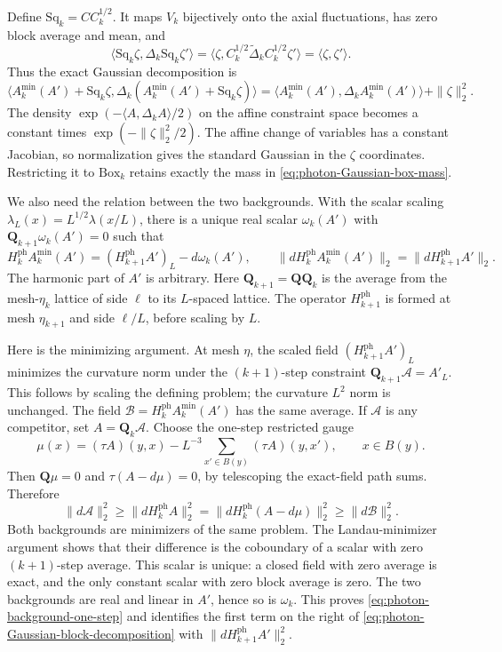 Define $\mathrm{Sq}_k=CC_k^{1/2}$. It maps $V_k$ bijectively onto
the axial fluctuations, has zero block average and mean, and
\[
 \langle\mathrm{Sq}_k\zeta,\Delta_k\mathrm{Sq}_k\zeta'\rangle
  =\langle\zeta,C_k^{1/2}\widetilde\Delta_kC_k^{1/2}\zeta'\rangle
  =\langle\zeta,\zeta'\rangle.
\]
Thus the exact Gaussian decomposition is
\begin{equation}\label{eq:photon-Gaussian-block-decomposition}
 \langle A_k^{\min}(A')+\mathrm{Sq}_k\zeta,
           \Delta_k(A_k^{\min}(A')+\mathrm{Sq}_k\zeta)\rangle
       =\langle A_k^{\min}(A'),\Delta_kA_k^{\min}(A')\rangle
                                                   +\|\zeta\|_2^2.
\end{equation}
The density $\exp(-\langle A,\Delta_kA\rangle/2)$ on the affine
constraint space becomes a constant times $\exp(-\|\zeta\|_2^2/2)$.
The affine change of variables has a constant Jacobian, so
normalization gives the standard Gaussian in the $\zeta$ coordinates.
Restricting it to $\mathrm{Box}_k$ retains exactly the mass in
\eqref{eq:photon-Gaussian-box-mass}.

We also need the relation between the two backgrounds. With the
scalar scaling $\lambda_L(x)=L^{1/2}\lambda(x/L)$, there is a
unique real scalar $\omega_k(A')$ with
$\mathbf Q_{k+1}\omega_k(A')=0$ such that
\begin{equation}\label{eq:photon-background-one-step}
 H_k^{\mathrm{ph}}A_k^{\min}(A')
       =(H_{k+1}^{\mathrm{ph}}A')_L-d\omega_k(A'),
 \qquad
 \|dH_k^{\mathrm{ph}}A_k^{\min}(A')\|_2
       =\|dH_{k+1}^{\mathrm{ph}}A'\|_2.
\end{equation}
The harmonic part of $A'$ is arbitrary.
Here $\mathbf Q_{k+1}=\mathbf Q\mathbf Q_k$ is the average from
the mesh-$\eta_k$ lattice of side $\ell$ to its $L$-spaced
lattice. The operator $H_{k+1}^{\mathrm{ph}}$ is formed at mesh
$\eta_{k+1}$ and side $\ell/L$, before scaling by $L$.

Here is the minimizing argument. At mesh $\eta$, the scaled field
$(H_{k+1}^{\mathrm{ph}}A')_L$ minimizes the curvature norm under
the $(k+1)$-step constraint $\mathbf Q_{k+1}\mathscr A=A'_L$.
This follows by scaling the defining problem; the curvature
$L^2$ norm is unchanged. The field
$\mathscr B=H_k^{\mathrm{ph}}A_k^{\min}(A')$ has the same average.
If $\mathscr A$ is any competitor, set $A=\mathbf Q_k\mathscr A$.
Choose the one-step restricted gauge
\[
 \mu(x)=(\tau A)(y,x)
            -L^{-3}\sum_{x'\in B(y)}(\tau A)(y,x'),
                 \qquad x\in B(y).
\]
Then $\mathbf Q\mu=0$ and $\tau(A-d\mu)=0$, by telescoping
the exact-field path sums. Therefore
\[
 \|d\mathscr A\|_2^2
 \ge\|dH_k^{\mathrm{ph}}A\|_2^2
 =\|dH_k^{\mathrm{ph}}(A-d\mu)\|_2^2
 \ge\|d\mathscr B\|_2^2.
\]
Both backgrounds are minimizers of the same problem. The
Landau-minimizer argument shows that their difference is the
coboundary of a scalar with zero $(k+1)$-step average. This scalar
is unique: a closed field with zero average is exact, and the
only constant scalar with zero block average is zero. The two
backgrounds are real and linear in $A'$, hence so is $\omega_k$.
This proves \eqref{eq:photon-background-one-step} and identifies
the first term on the right of
\eqref{eq:photon-Gaussian-block-decomposition} with
$\|dH_{k+1}^{\mathrm{ph}}A'\|_2^2$.

